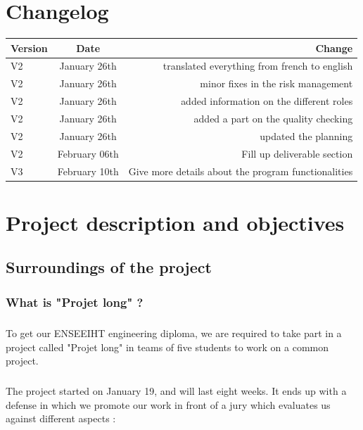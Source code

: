 \documentclass{report}
\begin{document}
\chapter*{Changelog}
\begin{tabular}{|l|c|r|}
  \hline
  Version & Date & Change  \\
  \hline
  V2 & January 26th  & translated everything from french to english \\
  V2 & January 26th  & minor fixes in the risk management \\
  V2 & January 26th  & added information on the different roles \\
  V2 & January 26th  & added a part on the quality checking \\
  V2 & January 26th  & updated the planning \\
  V2 & February 06th & Fill up deliverable section \\
  V3 & February 10th & Give more details about the program functionalities \\
  \hline
\end{tabular}
\chapter{Project description and objectives}

\section{Surroundings of the project}

\subsection{What is "Projet long" ?}

\paragraph{}
\hspace{4mm}\textnormal{To get our ENSEEIHT engineering diploma, we are required to take part in 
a project called "Projet long" in teams of five students to work 
on a common project.}

\paragraph{}
\hspace{4mm}\textnormal{The project started on January 19, and will last eight weeks. It ends up with 
a defense in which we promote our work in front of a jury which evaluates 
us against different aspects :}
\end{document}
